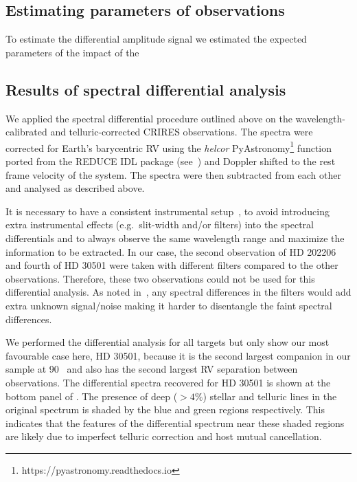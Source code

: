 




\subsection{Estimating parameters of observations}
To estimate the differential amplitude signal we estimated the expected parameters of the impact of the




\subsection{Results of spectral differential analysis}
\label{subsec:_differential_results}

We applied the spectral differential procedure outlined above on the wavelength-calibrated and telluric-corrected {CRIRES} observations. The spectra were corrected for Earth's barycentric {RV} using the \emph{helcor} PyAstronomy\footnote{https://pyastronomy.readthedocs.io} function ported from the REDUCE IDL package (see~\citet[][]{piskunov_new_2002}) and Doppler shifted to the rest frame velocity of the system. The spectra were then subtracted from each other and analysed as described above.


It is necessary to have a consistent instrumental setup~\citet{ferluga_separating_1997}, to avoid introducing extra instrumental effects (e.g.\ slit-width and/or filters) into the spectral differentials and to always observe the same wavelength range and maximize the information to be extracted. In our case, the second observation of {HD 202206} and fourth of {HD 30501} were taken with different filters compared to the other observations. Therefore, these two observations could not be used for this differential analysis. As noted in~\citep{hadrava_disentangling_2009}, any spectral differences in the filters would add extra unknown signal/noise making it harder to disentangle the faint spectral differences.


We performed the differential analysis for all targets but only show our most favourable case here, {HD 30501}, because it is the second largest companion in our sample at 90~\Mjup{} and also has the second largest {RV} separation between observations. The differential spectra recovered for {HD 30501} is shown at the bottom panel of . The presence of deep (\(>4\%\)) stellar and telluric lines in the original spectrum is shaded by the blue and green regions respectively. This indicates that the features of the differential spectrum near these shaded regions are likely due to imperfect telluric correction and host mutual cancellation.

